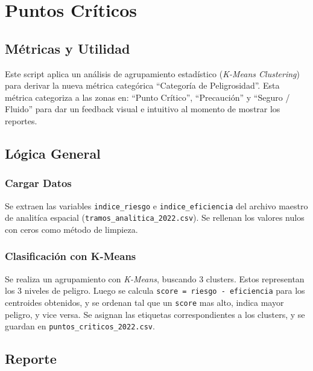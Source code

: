 \section{Puntos Críticos}

\subsection{Métricas y Utilidad}

Este script aplica un análisis de agrupamiento estadístico 
(\textit{K-Means Clustering}) 
para derivar la nueva métrica categórica ``Categoría de Peligrosidad''.
Esta m\'etrica categoriza a las zonas en: 
``Punto Crítico'', ``Precaución'' y ``Seguro / Fluido'' 
para dar un feedback visual e intuitivo al momento de mostrar los reportes.

\subsection{Lógica General}

\subsubsection*{Cargar Datos}
Se extraen las variables \texttt{indice\_riesgo} e \texttt{indice\_eficiencia}
del archivo maestro de analit\'ica espacial 
(\texttt{tramos\_analitica\_2022.csv}).
Se rellenan los valores nulos con ceros como m\'etodo de limpieza.

\subsubsection*{Clasificaci\'on con K-Means}

Se realiza un agrupamiento con \textit{K-Means}, buscando 3 clusters. Estos 
representan los 3 niveles de peligro. Luego se calcula 
\texttt{score = riesgo - eficiencia} para los centroides obtenidos, y se 
ordenan tal que un \texttt{score} mas alto, indica mayor peligro, y vice 
versa. Se asignan las etiquetas correspondientes a los clusters,
y se guardan en \texttt{puntos\_criticos\_2022.csv}.

\subsection{Reporte}

